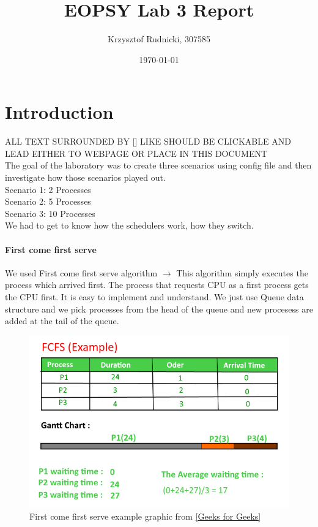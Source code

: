 \documentclass{article}
\begin{document}
\title{EOPSY Lab 3 Report}
\author{Krzysztof Rudnicki, 307585}
\date{\today}
\maketitle
\section{Introduction}
ALL TEXT SURROUNDED BY [] LIKE \cite{lab3 Manual} SHOULD BE CLICKABLE AND LEAD
EITHER TO WEBPAGE OR PLACE IN THIS DOCUMENT \\
The goal of the laboratory was to create three scenarios using config file and
then investigate how those scenarios played out. \\
Scenario 1: 2 Processes \\
Scenario 2: 5 Processes \\
Scenario 3: 10 Processes \\
We had to get to know how the schedulers work, how they switch. \cite{lab3
Manual} 
\paragraph{First come first serve}
We used First come first serve algorithm $\rightarrow$ This algorithm simply executes the process which
arrived first. The process that requests CPU as a first process gets the CPU
first. It is easy to implement and understand. We just use Queue data structure
and we pick processes from the head of the queue and new procesess are added at
the tail of the queue. \cite{First come first serve}
\begin{figure}[H]
	\caption{First come first serve example graphic from
		\href{https://www.geeksforgeeks.org/program-for-fcfs-cpu-scheduling-set-1/}{[Geeks for
	Geeks]}}
	\includegraphics[width=\textwidth]{FCFS}
\end{figure}
\end{document}
